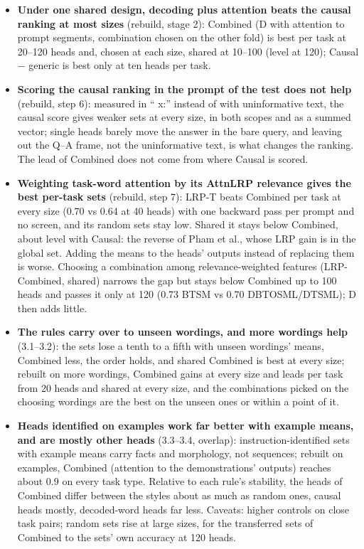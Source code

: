 \documentclass[10pt,a4paper]{article}
\newcommand{\yes}{\textcolor{green!45!black}{\ding{51}}}
\newcommand{\no}{\textcolor{red!70!black}{\ding{55}}}
\begin{document}
\begin{itemize}
\item \yes{} \textbf{Under one shared design, decoding plus attention beats the causal ranking at most sizes} (rebuild, stage 2): Combined (D with attention to prompt segments, combination chosen on the other fold) is best per task at 20--120 heads and, chosen at each size, shared at 10--100 (level at 120); Causal $-$ generic is best only at ten heads per task.
\item \no{} \textbf{Scoring the causal ranking in the prompt of the test does not help} (rebuild, step 6): measured in `` x:'' instead of with uninformative text, the causal score gives weaker sets at every size, in both scopes and as a summed vector; single heads barely move the answer in the bare query, and leaving out the Q--A frame, not the uninformative text, is what changes the ranking. The lead of Combined does not come from where Causal is scored.
\item \yes{} \textbf{Weighting task-word attention by its AttnLRP relevance gives the best per-task sets} (rebuild, step 7): LRP-T beats Combined per task at every size (0.70 vs 0.64 at 40 heads) with one backward pass per prompt and no screen, and its random sets stay low. Shared it stays below Combined, about level with Causal: the reverse of Pham et al., whose LRP gain is in the global set. Adding the means to the heads' outputs instead of replacing them is worse. Choosing a combination among relevance-weighted features (LRP-Combined, shared) narrows the gap but stays below Combined up to 100 heads and passes it only at 120 (0.73 BTSM vs 0.70 DBTOSML/DTSML); D then adds little.
\item \yes{} \textbf{The rules carry over to unseen wordings, and more wordings help} (3.1--3.2): the sets lose a tenth to a fifth with unseen wordings' means, Combined less, the order holds, and shared Combined is best at every size; rebuilt on more wordings, Combined gains at every size and leads per task from 20 heads and shared at every size, and the combinations picked on the choosing wordings are the best on the unseen ones or within a point of it.
\item \yes{} \textbf{Heads identified on examples work far better with example means, and are mostly other heads} (3.3--3.4, overlap): instruction-identified sets with example means carry facts and morphology, not sequences; rebuilt on examples, Combined (attention to the demonstrations' outputs) reaches about 0.9 on every task type. Relative to each rule's stability, the heads of Combined differ between the styles about as much as random ones, causal heads mostly, decoded-word heads far less. Caveats: higher controls on close task pairs; random sets rise at large sizes, for the transferred sets of Combined to the sets' own accuracy at 120 heads.

\end{itemize}
\end{document}
